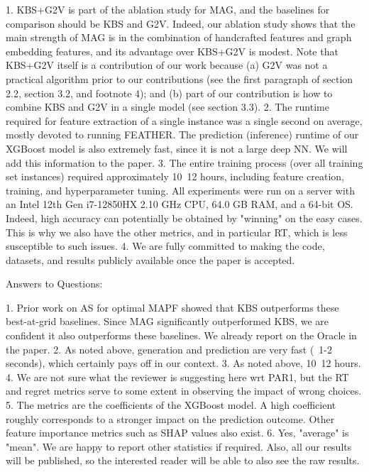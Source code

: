1. KBS+G2V is part of the ablation study for MAG, and the baselines for comparison should be KBS and G2V. Indeed, our ablation study shows that the main strength of MAG is in the combination of handcrafted features and graph embedding features, and its advantage over KBS+G2V is modest. Note that KBS+G2V itself is a contribution of our work because (a) G2V was not a practical algorithm prior to our contributions (see the first paragraph of section 2.2, section 3.2, and footnote 4); and (b) part of our contribution is how to combine KBS and G2V in a single model (see section 3.3).  
2. The runtime required for feature extraction of a single instance was a single second on average, mostly devoted to running FEATHER. The prediction (inference) runtime of our XGBoost model is also extremely fast, since it is not a large deep NN. We will add this information to the paper. 
3. The entire training process (over all training set instances) required approximately 10~12 hours, including feature creation, training, and hyperparameter tuning. All experiments were run on a server with an Intel 12th Gen i7-12850HX 2.10 GHz CPU, 64.0 GB RAM, and a 64-bit OS. Indeed, high accuracy can potentially be obtained by "winning" on the easy cases. This is why we also have the other metrics, and in particular RT, which is less susceptible to such issues. 
4. We are fully committed to making the code, datasets, and results publicly available once the paper is accepted. 

Answers to Questions:

1. Prior work on AS for optimal MAPF showed that KBS outperforms these best-at-grid baselines. Since MAG significantly outperformed KBS, we are confident it also outperforms these baselines. We already report on the Oracle in the paper. 
2. As noted above, generation and prediction are very fast (~1-2 seconds), which certainly pays off in our context. 
3. As noted above, 10~12 hours. 
4. We are not sure what the reviewer is suggesting here wrt PAR1, but the RT and regret metrics serve to some extent in observing the impact of wrong choices. 
5. The metrics are the coefficients of the XGBoost model. A high coefficient roughly corresponds to a stronger impact on the prediction outcome. Other feature importance metrics such as SHAP values also exist. 
6. Yes, "average" is "mean". We are happy to report other statistics if required. Also, all our results will be published, so the interested reader will be able to also see the raw results. 
